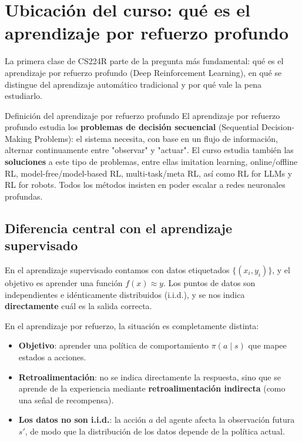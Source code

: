 \section{Ubicación del curso: qué es el aprendizaje por refuerzo profundo}

La primera clase de CS224R parte de la pregunta más fundamental: qué es el aprendizaje por refuerzo profundo (Deep Reinforcement Learning), en qué se distingue del aprendizaje automático tradicional y por qué vale la pena estudiarlo.

\begin{importantbox}{Definición del aprendizaje por refuerzo profundo}
El aprendizaje por refuerzo profundo estudia los \textbf{problemas de decisión secuencial} (Sequential Decision-Making Problems): el sistema necesita, con base en un flujo de información, alternar continuamente entre "observar" y "actuar". El curso estudia también las \textbf{soluciones} a este tipo de problemas, entre ellas imitation learning, online/offline RL, model-free/model-based RL, multi-task/meta RL, así como RL for LLMs y RL for robots. Todos los métodos insisten en poder escalar a redes neuronales profundas.
\end{importantbox}

\subsection{Diferencia central con el aprendizaje supervisado}

En el aprendizaje supervisado contamos con datos etiquetados $\{(x_i, y_i)\}$, y el objetivo es aprender una función $f(x) \approx y$. Los puntos de datos son independientes e idénticamente distribuidos (i.i.d.), y se nos indica \textbf{directamente} cuál es la salida correcta.

En el aprendizaje por refuerzo, la situación es completamente distinta:

\begin{itemize}
    \item \textbf{Objetivo}: aprender una política de comportamiento $\pi(a \mid s)$ que mapee estados a acciones.
    \item \textbf{Retroalimentación}: no se indica directamente la respuesta, sino que se aprende de la experiencia mediante \textbf{retroalimentación indirecta} (como una señal de recompensa).
    \item \textbf{Los datos no son i.i.d.}: la acción $a$ del agente afecta la observación futura $s'$, de modo que la distribución de los datos depende de la política actual.
\end{itemize}

